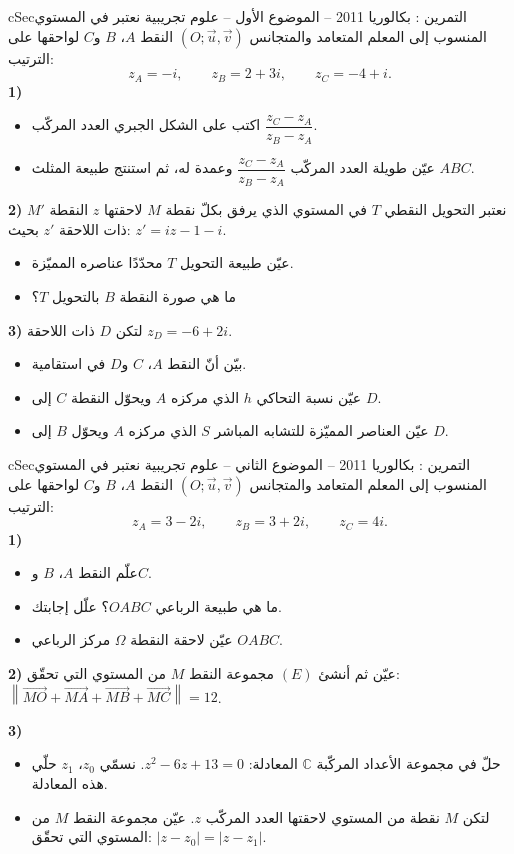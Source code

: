 \documentclass[12pt,a4paper]{article}
\newenvironment{BOX}[2]{\begin{otherlanguage}{english}\begin{arbox}{#1}{#2}}{\end{arbox}\end{otherlanguage}}
\newcounter{exo}
\newenvironment{tamrin}[1]{\stepcounter{exo}\begin{BOX}{cSec}{التمرين \theexo: #1}}{\end{BOX}}
\newenvironment{sq}{\begin{itemize}[leftmargin=2.4em,itemsep=3pt]}{\end{itemize}}
\newcommand{\qa}{\item[(أ)]}\newcommand{\qb}{\item[(ب)]}\newcommand{\qc}{\item[(جـ)]}\newcommand{\qd}{\item[(د)]}\newcommand{\qe}{\item[(هـ)]}
\begin{document}
\begin{tamrin}{بكالوريا 2011 -- الموضوع الأول -- علوم تجريبية}
نعتبر في المستوي المنسوب إلى المعلم المتعامد والمتجانس $(O;\vec u,\vec v)$ النقط $A$، $B$ و$C$ لواحقها على الترتيب:
\[z_A=-i,\qquad z_B=2+3i,\qquad z_C=-4+i .\]
\textbf{1)}
\begin{sq}
\qa اكتب على الشكل الجبري العدد المركّب $\dfrac{z_C-z_A}{z_B-z_A}$.
\qb عيّن طويلة العدد المركّب $\dfrac{z_C-z_A}{z_B-z_A}$ وعمدة له، ثم استنتج طبيعة المثلث $ABC$.
\end{sq}
\textbf{2)} نعتبر التحويل النقطي $T$ في المستوي الذي يرفق بكلّ نقطة $M$ لاحقتها $z$ النقطة $M'$ ذات اللاحقة $z'$ بحيث: $z'=iz-1-i$.
\begin{sq}
\qa عيّن طبيعة التحويل $T$ محدّدًا عناصره المميّزة.
\qb ما هي صورة النقطة $B$ بالتحويل $T$؟
\end{sq}
\textbf{3)} لتكن $D$ ذات اللاحقة $z_D=-6+2i$.
\begin{sq}
\qa بيّن أنّ النقط $A$، $C$ و$D$ في استقامية.
\qb عيّن نسبة التحاكي $h$ الذي مركزه $A$ ويحوّل النقطة $C$ إلى $D$.
\qc عيّن العناصر المميّزة للتشابه المباشر $S$ الذي مركزه $A$ ويحوّل $B$ إلى $D$.
\end{sq}
\end{tamrin}

\begin{tamrin}{بكالوريا 2011 -- الموضوع الثاني -- علوم تجريبية}
نعتبر في المستوي المنسوب إلى المعلم المتعامد والمتجانس $(O;\vec u,\vec v)$ النقط $A$، $B$ و$C$ لواحقها على الترتيب:
\[z_A=3-2i,\qquad z_B=3+2i,\qquad z_C=4i .\]
\textbf{1)}
\begin{sq}
\qa علّم النقط $A$، $B$ و$C$.
\qb ما هي طبيعة الرباعي $OABC$؟ علّل إجابتك.
\qc عيّن لاحقة النقطة $\Omega$ مركز الرباعي $OABC$.
\end{sq}
\textbf{2)} عيّن ثم أنشئ $(E)$ مجموعة النقط $M$ من المستوي التي تحقّق: $\left\|\overrightarrow{MO}+\overrightarrow{MA}+\overrightarrow{MB}+\overrightarrow{MC}\right\|=12$.

\textbf{3)}
\begin{sq}
\qa حلّ في مجموعة الأعداد المركّبة $\mathbb{C}$ المعادلة: $z^2-6z+13=0$. نسمّي $z_0$، $z_1$ حلّي هذه المعادلة.
\qb لتكن $M$ نقطة من المستوي لاحقتها العدد المركّب $z$. عيّن مجموعة النقط $M$ من المستوي التي تحقّق: $|z-z_0|=|z-z_1|$.
\end{sq}
\end{tamrin}
\end{document}
